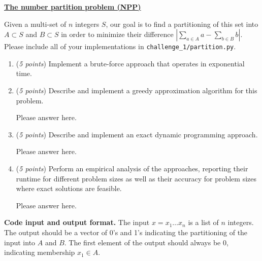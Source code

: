 \documentclass{hw}
\newcommand{\io}{\textbf{Code input and output format.} }
\begin{document}
\begin{challenge}
    \textbf{\href{https://en.wikipedia.org/wiki/Partition_problem}{The number partition problem (NPP)}}

    Given a multi-set of $n$ integers $S$,
    our goal is to find a partitioning of this set into $A\subset S$ and $B\subset S$
    in order to minimize their difference $|\sum_{a\in A}a - \sum_{b\in B}b|$.
    Please include all of your implementations in \texttt{challenge\_1/partition.py}.

    \begin{enumerate}[label={(\alph*)}]
        \item (\textit{5 points}) Implement a brute-force approach that operates in exponential time.

        \item (\textit{5 points}) Describe and implement a greedy approximation algorithm for this problem.
        
        \begin{solution}
        Please answer here.
        \end{solution}

        \item (\textit{5 points}) Describe and implement an exact dynamic programming approach.

        \begin{solution}
        Please answer here.
        \end{solution}

        \item(\textit{5 points}) Perform an empirical analysis of the approaches, reporting their runtime for different problem sizes as well as their accuracy for problem sizes where exact solutions are feasible.
    
        \begin{solution}
        Please answer here.
        \end{solution}

    \end{enumerate}


    \io The input $x=x_1 \ldots x_n$ is a list of $n$ integers.
    The output should be a vector of 0's and 1's
    indicating the partitioning of the input into $A$ and $B$.
    The first element of the output should always be 0, indicating membership $x_1 \in A$.
\end{challenge}

\end{document}
